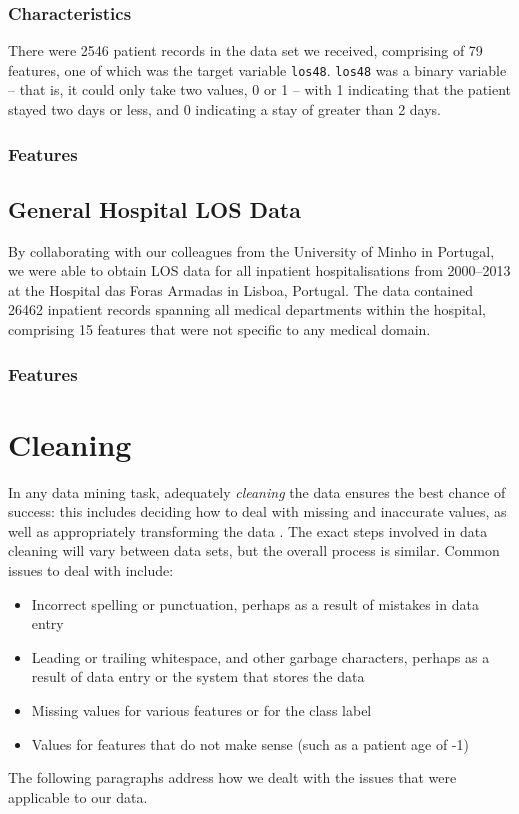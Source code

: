 \subsubsection{Characteristics}
There were 2546 patient records in the data set we received, comprising of 79
features, one of which was the target variable \texttt{los48}.
\texttt{los48} was a binary variable -- that is, it could only take two
values, 0 or 1 -- with 1 indicating that the patient stayed two days or less,
and 0 indicating a stay of greater than 2 days.

\subsubsection{Features}

\subsection{General Hospital LOS Data}
By collaborating with our colleagues from the University of Minho in Portugal,
we were able to obtain LOS data for all inpatient hospitalisations from
2000--2013 at the Hospital das Foras Armadas in Lisboa, Portugal. The data
contained 26462 inpatient records spanning all medical departments within the
hospital, comprising 15 features that were not specific to any medical domain.

\subsubsection{Features}

\section{Cleaning} %
In any data mining task, adequately \textit{cleaning} the data ensures the best
chance of success: this includes deciding how to deal with missing and
inaccurate values, as well as appropriately transforming the data
\citep{Witten2005}.
The exact steps involved in data cleaning will vary between data
sets, but the overall process is similar. Common issues to deal with include:
\begin{itemize}
\item Incorrect spelling or punctuation, perhaps as a result of mistakes in
data entry
\item Leading or trailing whitespace, and other garbage characters,
perhaps as a result of data entry or
the system that stores the data
\item Missing values for various features or for the class label
\item Values for features that do not make sense (such as a patient age of
-1)
\end{itemize}
The following paragraphs address how we dealt with the issues that were
applicable to our data.

